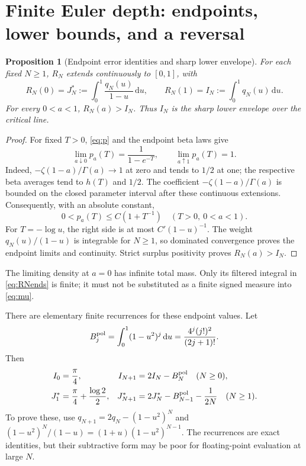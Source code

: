 \documentclass[11pt]{article}
\numberwithin{equation}{section}
\newtheorem{proposition}[theorem]{Proposition}
\theoremstyle{definition}\newtheorem{definition}[theorem]{Definition}
\theoremstyle{remark}\newtheorem{remark}[theorem]{Remark}
\newcommand{\dd}{\,\mathrm d}
\begin{document}
\section{Finite Euler depth: endpoints, lower bounds, and a reversal}
\label{sec:finite}
\begin{proposition}[Endpoint error identities and sharp lower envelope]
\label{prop:RNends}
For each fixed $N\ge1$, $R_N$ extends continuously to $[0,1]$, with
\begin{equation}\label{eq:RNends}
 R_N(0)=J_N^*:=\int_0^1\frac{q_N(u)}{1-u}\dd u,
 \qquad
 R_N(1)=I_N:=\int_0^1q_N(u)\dd u.
\end{equation}
For every $0<a<1$, $R_N(a)>I_N$. Thus $I_N$ is the sharp lower
envelope over the critical line.
\end{proposition}
\begin{proof}
For fixed $T>0$, \eqref{eq:p} and the endpoint beta laws give
\[
 \lim_{a\downarrow0}p_a(T)=\frac1{1-e^{-T}},
 \qquad \lim_{a\uparrow1}p_a(T)=1.
\]
Indeed, $-\zeta(1-a)/\Gamma(a)\to1$ at zero and tends to $1/2$ at
one; the respective beta averages tend to $h(T)$ and $1/2$.
The coefficient $-\zeta(1-a)/\Gamma(a)$ is bounded on the closed
parameter interval after these continuous extensions. Consequently,
with an absolute constant,
\begin{equation}\label{eq:pglobalbound}
 0<p_a(T)\le C(1+T^{-1})\quad(T>0,\ 0<a<1).
\end{equation}
For $T=-\log u$, the right side is at most $C'(1-u)^{-1}$.
The weight $q_N(u)/(1-u)$ is integrable for $N\ge1$, so dominated
convergence proves the endpoint limits and continuity. Strict surplus
positivity proves $R_N(a)>I_N$.
\end{proof}

The limiting density at $a=0$ has infinite total mass. Only its filtered
integral in \eqref{eq:RNends} is finite; it must not be substituted as a
finite signed measure into \eqref{eq:mu}.

There are elementary finite recurrences for these endpoint values. Let
\begin{equation}\label{eq:BNpoly}
 B_j^{\rm pol}=\int_0^1(1-u^2)^j\dd u
 =\frac{4^j(j!)^2}{(2j+1)!}.
\end{equation}
Then
\begin{align}
 I_0&=\frac\pi4,& I_{N+1}&=2I_N-B_N^{\rm pol}\quad(N\ge0),
 \label{eq:Irec}\\
 J_1^*&=\frac\pi4+\frac{\log2}{2},&
 J_{N+1}^*&=2J_N^*-B_{N-1}^{\rm pol}-\frac1{2N}\quad(N\ge1).
 \label{eq:Jrec}
\end{align}
To prove these, use $q_{N+1}=2q_N-(1-u^2)^N$ and
$(1-u^2)^N/(1-u)=(1+u)(1-u^2)^{N-1}$.
The recurrences are exact identities, but their subtractive form may be
poor for floating-point evaluation at large $N$.
\end{document}
